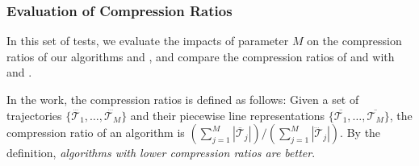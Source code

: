 \subsubsection{Evaluation of Compression Ratios}


In this set of tests, we evaluate the impacts of parameter $M$ on the compression ratios of our algorithms \cist and \cista, and compare the compression ratios of \cist and \cista with \dps and \squishe.

In the work, the compression ratios is defined as follows: Given a set of trajectories $\{\dddot{\mathcal{T}_1}, \ldots, \dddot{\mathcal{T}_M}\}$ and their piecewise line representations $\{\overline{\mathcal{T}_1}, \ldots, \overline{\mathcal{T}_M}\}$, the compression ratio of an algorithm is $(\sum_{j=1}^{M} |\overline{\mathcal{T}}_j |)/(\sum_{j=1}^{M} |\dddot{\mathcal{T}}_j |)$.
By the definition, \emph{algorithms with lower compression ratios are better}.







